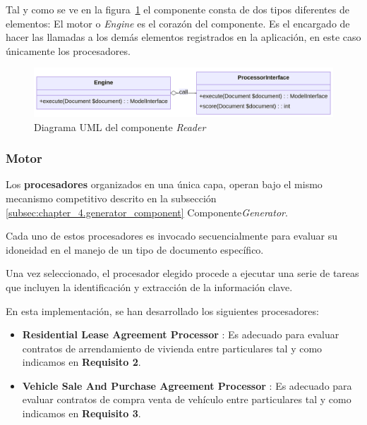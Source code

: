 Tal y como se ve en la figura~\ref{fig:chapter_4.1.reader_component_uml} el componente consta de dos tipos diferentes de
elementos: El motor o \textit{Engine} es el corazón del componente.
Es el encargado de hacer las llamadas a los demás elementos registrados en la aplicación, en este caso únicamente los
procesadores.

\begin{figure}[ht]
    \begin{center}
        \includegraphics[width=\textwidth]{./chapter/4/images/chapter_4.1.reader_component_uml}
        \caption{Diagrama UML del componente \textit{Reader}}
        \label{fig:chapter_4.1.reader_component_uml}
    \end{center}
\end{figure}

\subsubsection*{Motor}

Los \textbf{procesadores} organizados en una única capa,  operan bajo el mismo mecanismo competitivo descrito en la
subsección \ref{subsec:chapter_4.generator_component} Componente\textit{Generator}.

Cada uno de estos procesadores es invocado secuencialmente para evaluar su idoneidad en el manejo de un tipo de
documento específico.

Una vez seleccionado, el procesador elegido procede a ejecutar una serie de tareas que incluyen la identificación y
extracción de la información clave.

En esta implementación, se han desarrollado los siguientes procesadores:

\begin{itemize}
    \item \textbf{Residential Lease Agreement Processor}
    : Es adecuado para evaluar contratos de arrendamiento de vivienda entre
    particulares tal y como indicamos en \textbf{Requisito 2}.
    \item \textbf{Vehicle Sale And Purchase Agreement Processor}
    : Es adecuado para evaluar contratos de compra venta de vehículo
    entre particulares tal y como indicamos en \textbf{Requisito 3}.
\end{itemize}
